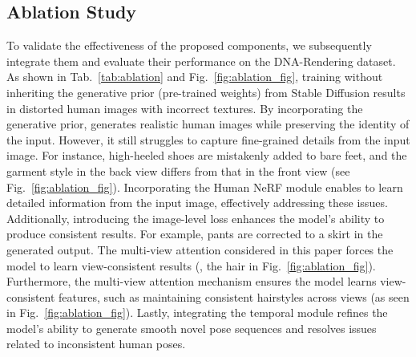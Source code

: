 \subsection{Ablation Study}
To validate the effectiveness of the proposed components, we subsequently integrate them and evaluate their performance on the DNA-Rendering dataset.
As shown in Tab.~\ref{tab:ablation} and Fig.~\ref{fig:ablation_fig}, training \nickname{} without inheriting the generative prior (pre-trained weights) from Stable Diffusion results in distorted human images with incorrect textures. 
By incorporating the generative prior, \nickname{} generates realistic human images while preserving the identity of the input. 
However, it still struggles to capture fine-grained details from the input image.
For instance, high-heeled shoes are mistakenly added to bare feet, and the garment style in the back view differs from that in the front view (see Fig.~\ref{fig:ablation_fig}). 
Incorporating the Human NeRF module enables \nickname{} to learn detailed information from the input image, effectively addressing these issues.
Additionally, introducing the image-level loss enhances the model's ability to produce consistent results. 
For example, pants are corrected to a skirt in the generated output.
The multi-view attention considered in this paper forces the model to learn view-consistent results (\eg, the hair in Fig.~\ref{fig:ablation_fig}). 
Furthermore, the multi-view attention mechanism ensures the model learns view-consistent features, such as maintaining consistent hairstyles across views (as seen in Fig.~\ref{fig:ablation_fig}). Lastly, integrating the temporal module refines the model's ability to generate smooth novel pose sequences and resolves issues related to inconsistent human poses.






